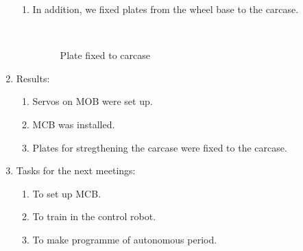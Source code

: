 \begin{enumerate}
\begin{enumerate}
        \item In addition, we fixed plates from the wheel base to the carcase.
        \begin{figure}[H]
        	\begin{minipage}[h]{0.2\linewidth}
        		\center  
        	\end{minipage}
        	\begin{minipage}[h]{0.6\linewidth}
        		\caption{Plate fixed to carcase}
        	\end{minipage}
        \end{figure}

	\end{enumerate}
	
	\item Results:
	\begin{enumerate}
		
		\item Servos on MOB were set up.
		
		\item MCB was installed.
		
		\item Plates for stregthening the carcase were fixed to the carcase.
		
	\end{enumerate}
	
	\item Tasks for the next meetings:
	\begin{enumerate}
		
		\item To set up MCB.
		
		\item To train in the control robot.
		
        \item To make programme of autonomous period.
			
	\end{enumerate}
\end{enumerate}
\fillpage
